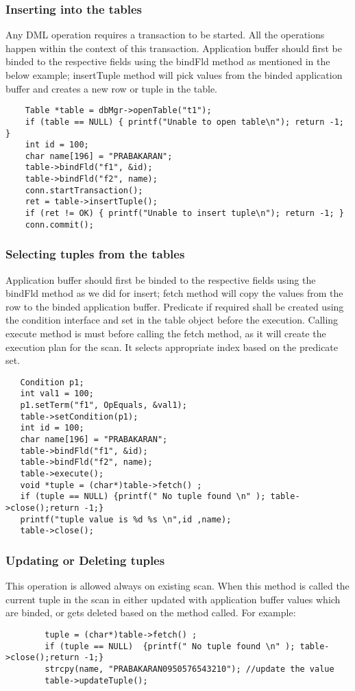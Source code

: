 \documentclass[12pt]{article}
\begin{document}
\subsubsection{Inserting into the tables}
\label{inserttable}
Any DML operation requires a transaction to be started. All the operations happen within the context of this transaction.
Application buffer should first be binded to the respective fields using the bindFld method as mentioned in the below example; insertTuple method will pick values from the binded application buffer and creates a new row or tuple in the table.
\begin{verbatim}
    Table *table = dbMgr->openTable("t1");
    if (table == NULL) { printf("Unable to open table\n"); return -1; }
    int id = 100;
    char name[196] = "PRABAKARAN";
    table->bindFld("f1", &id);
    table->bindFld("f2", name);
    conn.startTransaction();
    ret = table->insertTuple();
    if (ret != OK) { printf("Unable to insert tuple\n"); return -1; }
    conn.commit();
\end{verbatim}

\subsubsection{Selecting tuples from the tables}
\label{seltable}
Application buffer should first be binded to the respective fields using the bindFld method as we did for insert; fetch method will copy the values from the row to the binded application buffer.
Predicate if required shall be created using the condition interface and set in the table object before the execution. Calling execute method is must before calling the fetch method, as it will create the execution plan for the scan. It selects appropriate index based on the predicate set.

\begin{verbatim}
   Condition p1;
   int val1 = 100;
   p1.setTerm("f1", OpEquals, &val1);
   table->setCondition(p1);
   int id = 100;
   char name[196] = "PRABAKARAN";
   table->bindFld("f1", &id);
   table->bindFld("f2", name);
   table->execute();
   void *tuple = (char*)table->fetch() ;
   if (tuple == NULL) {printf(" No tuple found \n" ); table->close();return -1;}
   printf("tuple value is %d %s \n",id ,name);
   table->close();
\end{verbatim}
  
\subsubsection{Updating or Deleting tuples}
\label{updtable}
This operation is allowed always on existing scan. When this method is called the current tuple in the scan in either updated with application buffer values which are binded, or gets deleted based on the method called.
For example:
\begin{verbatim}
        tuple = (char*)table->fetch() ;
        if (tuple == NULL)  {printf(" No tuple found \n" ); table->close();return -1;}
        strcpy(name, "PRABAKARAN0950576543210"); //update the value
        table->updateTuple();
\end{verbatim}

\end{document}

